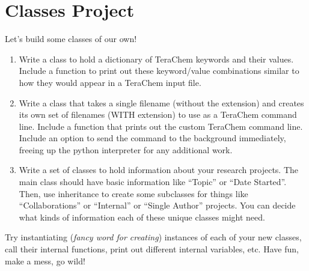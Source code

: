 \section{Classes Project}
Let's build some classes of our own!

\begin{enumerate}
\def\labelenumi{\arabic{enumi}.}
\tightlist
\item
  Write a class to hold a dictionary of TeraChem keywords and their
  values. Include a function to print out these keyword/value
  combinations similar to how they would appear in a TeraChem input
  file.
\item
  Write a class that takes a single filename (without the extension) and
  creates its own set of filenames (WITH extension) to use as a TeraChem
  command line. Include a function that prints out the custom TeraChem
  command line. Include an option to send the command to the background
  immediately, freeing up the python interpreter for any additional
  work.
\item
  Write a set of classes to hold information about your research
  projects. The main class should have basic information like ``Topic''
  or ``Date Started''. Then, use inheritance to create some subclasses
  for things like ``Collaborations'' or ``Internal'' or ``Single
  Author'' projects. You can decide what kinds of information each of
  these unique classes might need.
\end{enumerate}

Try instantiating (\emph{fancy word for creating}) instances of each of
your new classes, call their internal functions, print out different
internal variables, etc. Have fun, make a mess, go wild!

